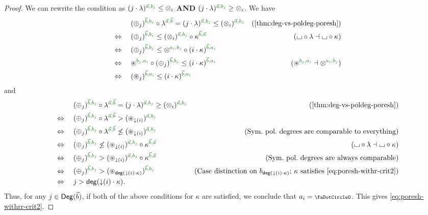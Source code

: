 \documentclass[a4paper]{memoir}
\begin{document}
\begin{proof}
	We can rewrite the condition as $(j \cdot \lambda)\pmrhom{\vec a}{b_j} \leq \mixpol_i$ \textbf{AND} $(j \cdot \lambda)\pmrhom{\vec a}{b_j} \geq \mixpol_i$. We have
	\begin{align*}
		&\quad\mathrel{\phantom{\Leftrightarrow}}\quad
		(\pospol_j)\pmrhom{\vec b}{b_j} \circ \lambda\pmrhom{\vec a}{\vec b} = (j \cdot \lambda)\pmrhom{\vec a}{b_j} \leq (\mixpol_i)\pmrhom{\vec a}{b_j}
		& \text{(\cref{thm:deg-vs-poldeg-poresh})}
		\\ &\quad\Leftrightarrow\quad
		(\pospol_j)\pmrhom{\vec b}{b_j} \leq (\mixpol_i)\pmrhom{\vec a}{b_j} \circ \kappa\pmrhom{\vec b}{\vec a}
		& \text{($\loch\circ  \lambda \dashv \loch \circ \kappa$)}
		\\ &\quad\Leftrightarrow\quad
		(\pospol_j)\pmrhom{\vec b}{b_j} \leq \mixpol\pmrhom{a_i}{b_j} \circ (i \cdot \kappa)\pmrhom{\vec b}{a_i}
		\\ &\quad\Leftrightarrow\quad
		\isopol\pmrhom{b_j}{a_i} \circ (\pospol_j)\pmrhom{\vec b}{b_j} \leq (i \cdot \kappa)\pmrhom{\vec b}{a_i}
		& \text{($\isopol\pmrhom{b_j}{a_i} \dashv \mixpol\pmrhom{a_i}{b_j}$)}
		\\ &\quad\Leftrightarrow\quad
		(\isopol_j)\pmrhom{\vec b}{a_i} \leq (i \cdot \kappa)\pmrhom{\vec b}{a_i}
	\end{align*}
	and
	\begin{align*}
		&\quad\mathrel{\phantom{\Leftrightarrow}}\quad
		(\pospol_j)\pmrhom{\vec b}{b_j} \circ \lambda\pmrhom{\vec a}{\vec b} = (j \cdot \lambda)\pmrhom{\vec a}{b_j} \geq (\mixpol_i)\pmrhom{\vec a}{b_j}
		& \text{(\cref{thm:deg-vs-poldeg-poresh})}
		\\ &\quad\Leftrightarrow\quad
		(\pospol_j)\pmrhom{\vec b}{b_j} \circ \lambda\pmrhom{\vec a}{\vec b} > (\isopol_{\predeg(i)})\pmrhom{\vec a}{b_j}
		\\ &\quad\Leftrightarrow\quad
		(\pospol_j)\pmrhom{\vec b}{b_j} \circ \lambda\pmrhom{\vec a}{\vec b} \not\leq (\isopol_{\predeg(i)})\pmrhom{\vec a}{b_j}
		& \text{(Sym.\ pol.\ degrees are comparable to everything)}
		\\ &\quad\Leftrightarrow\quad
		(\pospol_j)\pmrhom{\vec b}{b_j} \not\leq (\isopol_{\predeg(i)})\pmrhom{\vec a}{b_j} \circ \kappa\pmrhom{\vec b}{\vec a}
		& \text{($\loch\circ  \lambda \dashv \loch \circ \kappa$)}
		\\ &\quad\Leftrightarrow\quad
		(\pospol_j)\pmrhom{\vec b}{b_j} > (\isopol_{\predeg(i)})\pmrhom{\vec a}{b_j} \circ \kappa\pmrhom{\vec b}{\vec a}
		& \text{(Sym.\ pol.\ degrees are always comparable)}
		\\ &\quad\Leftrightarrow\quad
		(\pospol_j)\pmrhom{\vec b}{b_j} > (\isopol_{\getdeg(\predeg(i) \cdot \kappa)})\pmrhom{\vec b}{b_j}
		& \text{(Case distinction on $b_{\getdeg(\predeg(i) \cdot \kappa)}$; $\kappa$ satisfies \cref{eq:poresh-withr-crit2})}
		\\ &\quad\Leftrightarrow\quad
		j > \getdeg(\predeg(i) \cdot \kappa).
	\end{align*}
	Thus, for any $j \in {\mathsf{Deg}}(\vec b)$, if both of the above conditions for $\kappa$ are satisfied, we conclude that $a_i = \npolar$. This gives \cref{eq:poresh-withrr-crit2}.
\end{proof}
\end{document}
